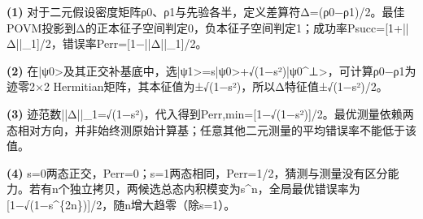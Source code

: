 \par\noindent\textbf{(1)} 对于二元假设密度矩阵ρ0、ρ1与先验各半，定义差算符Δ=(ρ0−ρ1)/2。最佳POVM投影到Δ的正本征子空间判定0，负本征子空间判定1；成功率Psucc=[1+||Δ||\_1]/2，错误率Perr=[1−||Δ||\_1]/2。
\par\noindent\textbf{(2)} 在|ψ0>及其正交补基底中，选|ψ1>=s|ψ0>+√(1−s²)|ψ0\textasciicircum{}⊥>，可计算ρ0−ρ1为迹零2×2 Hermitian矩阵，其本征值为±√(1−s²)，所以Δ特征值±√(1−s²)/2。
\par\noindent\textbf{(3)} 迹范数||Δ||\_1=√(1−s²)，代入得到Perr,min=[1−√(1−s²)]/2。最优测量依赖两态相对方向，并非始终测原始计算基；任意其他二元测量的平均错误率不能低于该值。
\par\noindent\textbf{(4)} s=0两态正交，Perr=0；s=1两态相同，Perr=1/2，猜测与测量没有区分能力。若有n个独立拷贝，两候选总态内积模变为s\textasciicircum{}n，全局最优错误率为[1−√(1−s\textasciicircum{}\{2n\})]/2，随n增大趋零（除s=1）。
